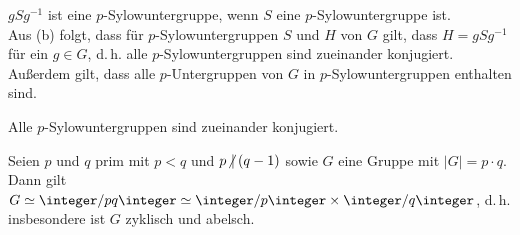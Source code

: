 \begin{Bem}
    $gSg^{-1}$ ist eine $p$-Sylowuntergruppe, wenn $S$ eine
    $p$-Sylowuntergruppe ist.\\
    Aus (b) folgt, dass für $p$-Sylowuntergruppen $S$ und $H$ von $G$ gilt,
    dass $H = gSg^{-1}$ für ein $g \in G$, d.\,h. alle $p$-Sylowuntergruppen
    sind zueinander konjugiert.\\
    Außerdem gilt, dass alle $p$-Untergruppen von $G$ in $p$-Sylowuntergruppen
    enthalten sind.
\end{Bem}

\begin{Kor}
    Alle $p$-Sylowuntergruppen sind zueinander konjugiert.
\end{Kor}

\begin{Kor}
    Seien $p$ und $q$ prim mit $p < q$ und $p \mathbin{\!\not|} (q - 1)$
    sowie $G$ eine Gruppe mit $|G| = p \cdot q$.
    Dann gilt $G \simeq \integer/pq\integer \simeq
    \integer/p\integer \times \integer/q\integer$, d.\,h. insbesondere ist
    $G$ zyklisch und abelsch.
\end{Kor}

\pagebreak
